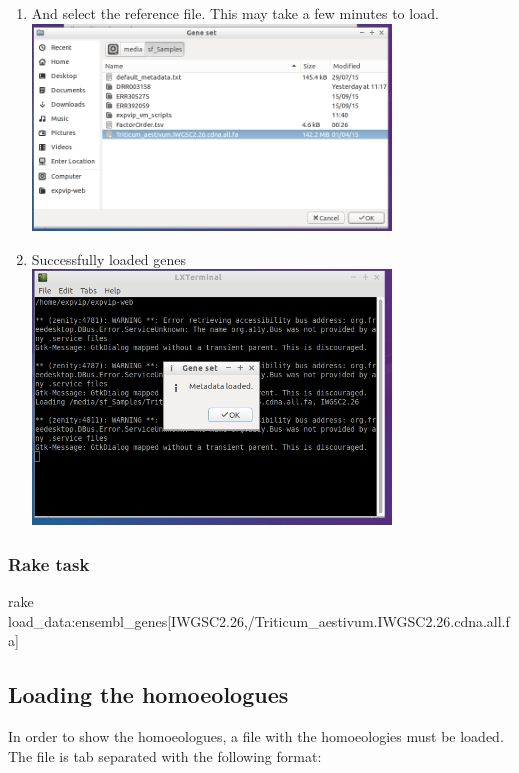 \begin{enumerate}
\item
  And select the reference file. This may take a few minutes to load.
  \\ \includegraphics[width=0.75\textwidth]{expVIP/tutorial/images/LoadGeneSet04.png}
\item
  Successfully loaded genes \\ \includegraphics[width=0.75\textwidth]{expVIP/tutorial/images/LoadGeneSet05.png}
\end{enumerate}

\subsubsection{Rake task}\label{rake-task-2}

\begin{code}[language=sh]
rake load_data:ensembl_genes[IWGSC2.26,/Triticum_aestivum.IWGSC2.26.cdna.all.fa]
\end{code}

\subsection{Loading the homoeologues}\label{loading-the-homoeologues}

In order to show the homoeologues, a file with the homoeologies must be
loaded. The file is tab separated with the following format:

